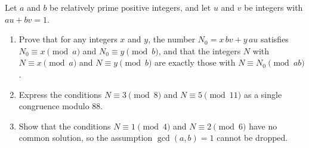 Let $a$ and $b$ be relatively prime positive integers, and let $u$ and $v$ be integers with $au+bv=1$.
\begin{enumerate}
\item[(a)] Prove that for any integers $x$ and $y$, the number $N_0=x\,bv+y\,au$ satisfies $N_0\equiv x\pmod a$ and $N_0\equiv y\pmod b$, and that the integers $N$ with $N\equiv x\pmod a$ and $N\equiv y\pmod b$ are exactly those with $N\equiv N_0\pmod{ab}$.
\item[(b)] Express the conditions $N\equiv3\pmod8$ and $N\equiv5\pmod{11}$ as a single congruence modulo $88$.
\item[(c)] Show that the conditions $N\equiv1\pmod4$ and $N\equiv2\pmod6$ have no common solution, so the assumption $\gcd(a,b)=1$ cannot be dropped.
\end{enumerate}
